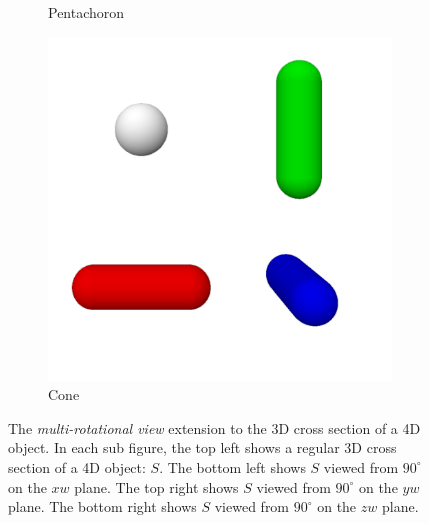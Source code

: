 \documentclass{l4proj}
\begin{document}
\begin{figure}[H]
\begin{subfigure}[b]{0.33\textwidth}
    \caption{Pentachoron}
    \label{fig:rep_multi-pentachoron}
  \end{subfigure}
  \begin{subfigure}[b]{0.33\textwidth}
    \includegraphics[width=\textwidth]{images/representations/multi-capsule.png}
    \caption{Cone}
    \label{fig:rep_multi-cone}
  \end{subfigure}
  \caption{
    The \emph{multi-rotational view} extension to the 3D cross section of a 4D object. In each sub figure, the top left shows a regular 3D cross section of a 4D object: $S$. The bottom left shows $S$ viewed from $90^{\circ}$ on the $xw$ plane. The top right shows $S$ viewed from $90^{\circ}$ on the $yw$ plane. The bottom right shows $S$ viewed from $90^{\circ}$ on the $zw$ plane.
    }
  \label{fig:rep_multi}
\end{figure}
\end{document}
